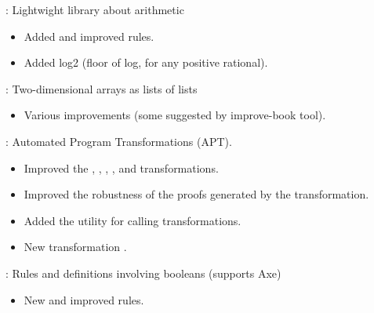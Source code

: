 \begin{frame}

\implibtitle

:
Lightwight library about arithmetic
\begin{itemize}
\item Added and improved rules.
\item Added log2 (floor of log, for any positive rational).
\end{itemize}

\end{frame}


\begin{frame}

\implibtitle

:
Two-dimensional arrays as lists of lists
\begin{itemize}
\item Various improvements (some suggested by improve-book tool).
\end{itemize}

\end{frame}


\begin{frame}

\implibtitle

:
Automated Program Transformations (APT).
\begin{itemize}
\item Improved the , ,
  , , and
   transformations.
\item Improved the robustness of the proofs
  generated by the  transformation.
\item Added the  utility for calling transformations.
\item New transformation .
\end{itemize}

\end{frame}


\begin{frame}

\implibtitle

:
Rules and definitions involving booleans (supports Axe)
\begin{itemize}
\item New and improved rules.
\end{itemize}

\end{frame}

